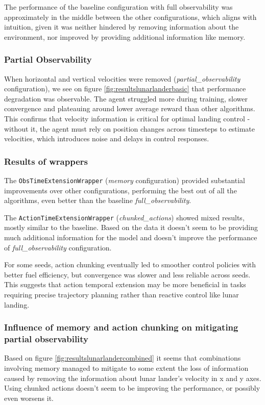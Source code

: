 \documentclass[12pt, a4paper]{article}
\begin{document}
The performance of the baseline configuration with full observability was approximately in the middle between the other configurations, which aligns with intuition, given it was neither hindered by removing information about the environment, nor improved by providing additional information like memory.

\subsubsection{Partial Observability}
When horizontal and vertical velocities were removed (\textit{partial\_observability} configuration), we see on figure \ref{fig:resultslunarlanderbasic} that performance degradation was  observable. The agent struggled more during training, slower convergence and plateauing around lower average reward than other algorithms. This confirms that velocity information is critical for optimal landing control - without it, the agent must rely on position changes across timesteps to estimate velocities, which introduces noise and delays in control responses.

\subsubsection{Results of wrappers}

The \texttt{ObsTimeExtensionWrapper} (\textit{memory} configuration) provided substantial improvements over other configurations, performing the best out of all the algorithms, even better than the baseline \textit{full\_observability}. 

The \texttt{ActionTimeExtensionWrapper} (\textit{chunked\_actions}) showed mixed results, mostly similar to the baseline. Based on the data it doesn't seem to be providing much additional information for the model and doesn't improve the performance of \textit{full\_observability} configuration. 

For some seeds, action chunking eventually led to smoother control policies with better fuel efficiency, but convergence was slower and less reliable across seeds. This suggests that action temporal extension may be more beneficial in tasks requiring precise trajectory planning rather than reactive control like lunar landing.

\subsubsection{Influence of memory and action chunking on mitigating partial observability}
Based on figure \ref{fig:resultslunarlandercombined} it seems that combinations involving memory managed to mitigate to some extent the loss of information caused by removing the information about lunar lander's velocity in x and y axes. Using chunked actions doesn't seem to be improving the performance, or possibly even worsens it.
\end{document}
